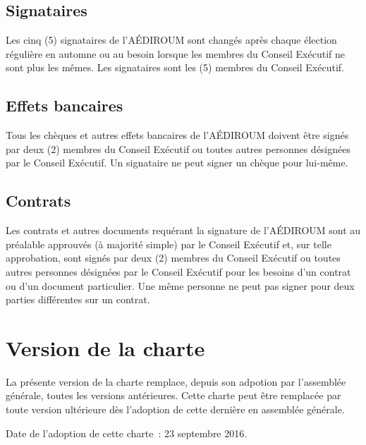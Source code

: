 \documentclass{aediroum}
\begin{document}
\subsection{Signataires}\label{sec:signataires}
Les cinq (5) signataires de l'AÉDIROUM sont changés après chaque élection régulière en automne ou au besoin lorsque les membres du Conseil Exécutif ne sont plus les mêmes. Les signataires sont les (5) membres du Conseil Exécutif.

\subsection{Effets bancaires}\label{sec:effets-bancaires}

Tous les chèques et autres effets bancaires de l'AÉDIROUM doivent être signés par deux (2) membres du Conseil Exécutif ou toutes autres personnes désignées par le Conseil Exécutif. Un signataire ne peut signer un chèque pour lui-même.

\subsection{Contrats}\label{sec:contrats}

Les contrats et autres documents requérant la signature de l'AÉDIROUM sont au préalable approuvés (à majorité simple) par le Conseil Exécutif et, sur telle approbation, sont signés par deux (2) membres du Conseil Exécutif ou toutes autres personnes désignées par le Conseil Exécutif pour les besoins d'un contrat ou d'un document particulier. Une même personne ne peut pas signer pour deux parties différentes sur un contrat.

\section{Version de la charte}\label{sec:version-de-la-charte}
La présente version de la charte remplace, depuis son adpotion par l'assemblée générale, toutes les versions antérieures. Cette charte peut être remplacée par toute version ultérieure dès l'adoption de cette dernière en assemblée générale.

Date de l'adoption de cette charte~: 23 septembre 2016.
\end{document}
